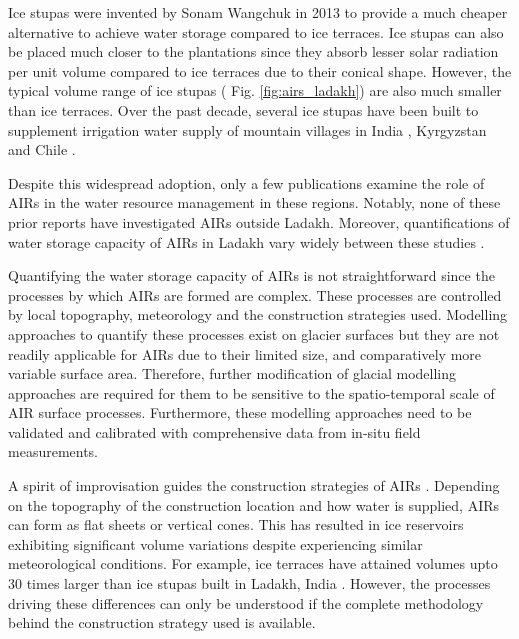 Ice stupas were invented by Sonam Wangchuk in 2013 \cite{wangchukIceStupaArtificial2014} to provide a much
cheaper alternative to achieve water storage compared to ice terraces. Ice stupas can also be placed much closer
to the plantations since they absorb lesser solar radiation per unit volume compared to ice terraces due to
their conical shape. However, the typical volume range of ice stupas ( Fig. \ref{fig:airs_ladakh}) are also
much smaller than ice terraces. Over the past decade, several ice stupas have been built to supplement
irrigation water supply of mountain villages in India \citep{wangchukIceStupaCompetition2020,
palmerStoringFrozenWater2022, aggarwalAdaptationClimateChange2021}, Kyrgyzstan
\citep{bbcnewsBrightArtificialGlacier2020} and Chile \citep{reutersConservationistsChileAim2021}.

Despite this widespread adoption, only a few publications examine the role of AIRs in the water resource
management in these regions. Notably, none of these prior reports have investigated AIRs outside Ladakh.
Moreover, quantifications of water storage capacity of AIRs in Ladakh vary widely between these studies
\citep{norphelSnowWaterHarvesting2015, baglaArtificialGlaciersHelp1998}.

Quantifying the water storage capacity of AIRs is not straightforward since the processes by which AIRs are
formed are complex. These processes are controlled by local topography, meteorology and the construction
strategies used. Modelling approaches to quantify these processes exist on glacier surfaces but they are not
readily applicable for AIRs due to their limited size, and comparatively more variable surface area. Therefore,
further modification of glacial modelling approaches are required for them to be sensitive to the
spatio-temporal scale of AIR surface processes. Furthermore, these modelling approaches need to be validated and
calibrated with comprehensive data from in-situ field measurements. 

A spirit of improvisation guides the construction strategies of AIRs \cite{clouseLadakhArtificialGlaciers2017}.
Depending on the topography of the construction location and how water is supplied, AIRs can form as flat sheets
or vertical cones. This has resulted in ice reservoirs exhibiting significant volume variations despite
experiencing similar meteorological conditions. For example, ice terraces have attained volumes upto 30 times
larger than ice stupas built in Ladakh, India \cite{nusserSociohydrologyArtificialGlaciers2019}. However, the
processes driving these differences can only be understood if the complete methodology behind the construction
strategy used is available.

